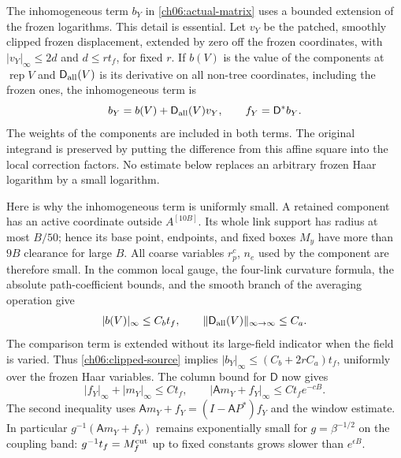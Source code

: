 The inhomogeneous term $b_Y$ in \eqref{ch06:actual-matrix} uses a bounded extension of the
frozen logarithms. This detail is essential. Let $v_Y$ be the patched,
smoothly clipped frozen displacement, extended by zero off the frozen
coordinates, with $|v_Y|_\infty\le2d$ and $d\le r t_f$, for fixed $r$.
If $b(V)$ is the value of the components at $\operatorname{rep}V$ and
$\mathsf D_{\rm all}(V)$ is its derivative on all non-tree coordinates,
including the frozen ones, the inhomogeneous term is
\begin{equation}
 b_Y=b(V)+\mathsf D_{\rm all}(V)v_Y,\qquad
 f_Y=\mathsf D^*b_Y .
 \label{ch06:clipped-source}
\end{equation}
The weights of the components are included in both terms. The original integrand is
preserved by putting the difference from this affine square into the
local correction factors. No estimate below replaces an arbitrary
frozen Haar logarithm by a small logarithm.

Here is why the inhomogeneous term is uniformly small. A retained component has an active
coordinate outside $A^{[10B]}$. Its whole
link support has radius at most $B/50$; hence its base point, endpoints, and fixed
boxes $M_y$ have more than $9B$ clearance for large $B$. All coarse
variables $r_p^c$, $n_e$ used by the component are therefore small. In the common local gauge,
the four-link curvature formula, the absolute path-coefficient bounds,
and the smooth branch of the averaging operation give
\[
 |b(V)|_\infty\le C_b t_f,\qquad
 \|\mathsf D_{\rm all}(V)\|_{\infty\to\infty}\le C_a.
\]
The comparison term is extended without its large-field indicator when the field is
varied. Thus \eqref{ch06:clipped-source} implies
$|b_Y|_\infty\le(C_b+2rC_a)t_f$, uniformly over the frozen Haar variables.
The column bound for $\mathsf D$ now gives
\begin{equation}
 |f_Y|_\infty+|m_Y|_\infty\le C t_f,\qquad
 |\mathsf A m_Y+f_Y|_\infty\le C t_f e^{-cB}.
 \label{ch06:actual-forcing}
\end{equation}
The second inequality uses
$\mathsf A m_Y+f_Y=(I-\mathsf A P^*)f_Y$ and the window estimate.
In particular $g^{-1}(\mathsf A m_Y+f_Y)$ remains exponentially small
for $g=\beta^{-1/2}$ on the coupling band: $g^{-1}t_f=M_f^{\rm cut}$
up to fixed constants grows slower than $e^{\epsilon B}$.

